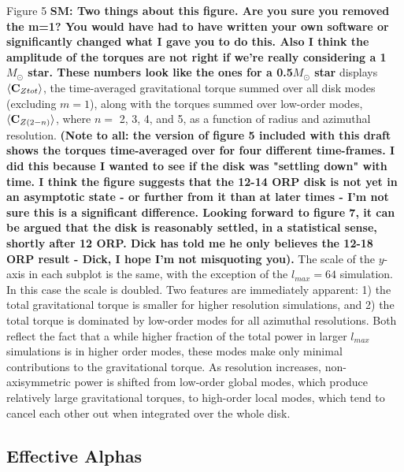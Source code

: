 \documentclass[manuscript]{aastex} %
\begin{document}
Figure 5 {\bf SM: Two things about this figure. Are you sure you removed the m=1? You would have had to have written your own software or significantly changed what I gave you to do this. Also I think the amplitude of the torques are not right if we're really considering a 1$M_\odot$ star. These numbers look like the ones for a 0.5$M_\odot$ star} displays $\langle {\rm \bf C}_{Ztot} \rangle$, the time-averaged gravitational torque summed over all disk modes (excluding $m=1$), along with the torques summed over low-order modes, $\langle {\rm \bf C}_{Z(2-n)} \rangle$, where $n = $ 2, 3, 4, and 5, as a function of radius and azimuthal resolution. 
{\bf (Note to all: the version of figure 5 included with this draft  shows the torques
time-averaged over for four different time-frames.  I did this because I wanted to see if the disk was 
"settling down" with time.  I think the figure suggests  that the 12-14 ORP disk is not
yet in an asymptotic state - or further from it than at later times - I'm not sure this is
a significant difference.  Looking forward to figure 7, it can be argued that the
disk is reasonably settled, in a statistical sense, shortly after 12 ORP.
Dick has told me he only believes the 12-18 ORP result - Dick, I hope 
I'm not misquoting you).  
} 
The scale of the $y$-axis in each subplot is the same, with the exception of the $l_{max} = 64$ simulation. 
In this case the scale is doubled.  Two features are immediately apparent: 1) the total gravitational torque is smaller for higher resolution simulations, and 2) the total torque is dominated by low-order modes for all azimuthal resolutions. Both reflect the fact that a while higher fraction of the total power in larger $l_{max}$ simulations is in higher order modes, these modes make only minimal contributions to the gravitational torque. As resolution increases, non-axisymmetric power is shifted from low-order global modes, which produce relatively large gravitational torques, to high-order local modes, which tend to cancel each other out when integrated over the whole disk. 

\subsection{Effective Alphas}
\end{document}
